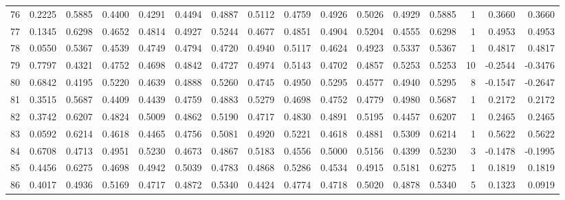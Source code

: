 \begin{tabular}{lrrrrrrrrrrrrrrr}
76  &      0.2225 &  0.5885 &  0.4400 &  0.4291 &  0.4494 &  0.4887 &  0.5112 &  0.4759 &  0.4926 &  0.5026 &   0.4929 &     0.5885 &      1 &                    0.3660 &                     0.3660 \\
77  &      0.1345 &  0.6298 &  0.4652 &  0.4814 &  0.4927 &  0.5244 &  0.4677 &  0.4851 &  0.4904 &  0.5204 &   0.4555 &     0.6298 &      1 &                    0.4953 &                     0.4953 \\
78  &      0.0550 &  0.5367 &  0.4539 &  0.4749 &  0.4794 &  0.4720 &  0.4940 &  0.5117 &  0.4624 &  0.4923 &   0.5337 &     0.5367 &      1 &                    0.4817 &                     0.4817 \\
79  &      0.7797 &  0.4321 &  0.4752 &  0.4698 &  0.4842 &  0.4727 &  0.4974 &  0.5143 &  0.4702 &  0.4857 &   0.5253 &     0.5253 &     10 &                   -0.2544 &                    -0.3476 \\
80  &      0.6842 &  0.4195 &  0.5220 &  0.4639 &  0.4888 &  0.5260 &  0.4745 &  0.4950 &  0.5295 &  0.4577 &   0.4940 &     0.5295 &      8 &                   -0.1547 &                    -0.2647 \\
81  &      0.3515 &  0.5687 &  0.4409 &  0.4439 &  0.4759 &  0.4883 &  0.5279 &  0.4698 &  0.4752 &  0.4779 &   0.4980 &     0.5687 &      1 &                    0.2172 &                     0.2172 \\
82  &      0.3742 &  0.6207 &  0.4824 &  0.5009 &  0.4862 &  0.5190 &  0.4717 &  0.4830 &  0.4891 &  0.5195 &   0.4457 &     0.6207 &      1 &                    0.2465 &                     0.2465 \\
83  &      0.0592 &  0.6214 &  0.4618 &  0.4465 &  0.4756 &  0.5081 &  0.4920 &  0.5221 &  0.4618 &  0.4881 &   0.5309 &     0.6214 &      1 &                    0.5622 &                     0.5622 \\
84  &      0.6708 &  0.4713 &  0.4951 &  0.5230 &  0.4673 &  0.4867 &  0.5183 &  0.4556 &  0.5000 &  0.5156 &   0.4399 &     0.5230 &      3 &                   -0.1478 &                    -0.1995 \\
85  &      0.4456 &  0.6275 &  0.4698 &  0.4942 &  0.5039 &  0.4783 &  0.4868 &  0.5286 &  0.4534 &  0.4915 &   0.5181 &     0.6275 &      1 &                    0.1819 &                     0.1819 \\
86  &      0.4017 &  0.4936 &  0.5169 &  0.4717 &  0.4872 &  0.5340 &  0.4424 &  0.4774 &  0.4718 &  0.5020 &   0.4878 &     0.5340 &      5 &                    0.1323 &                     0.0919 \\

\end{tabular}
